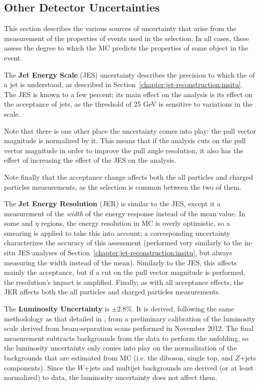 \FloatBarrier

	\subsection{Other Detector Uncertainties}
	\label{chapter:color:uncertainties:other}

	This section describes the various sources of uncertainty that arise from the measurement of the properties of events used in the selection. In all cases, these assess the degree to which the MC predicts the properties of some object in the event.


	The \textbf{Jet Energy Scale} (JES) uncertainty describes the precision to which the \pt of a jet is understood, as described in Section~\ref{chapter:jet-reconstruction:insitu}. The JES is known to a few percent; its main effect on the analysis is its effect on the acceptance of jets, as the \pt threshold of 25 GeV is sensitive to variations in the \pt scale.

	Note that there is one other place the \pt uncertainty comes into play: the pull vector magnitude is normalized by it. This means that if the analysis cuts on the pull vector magnitude in order to improve the pull angle resolution, it also has the effect of increasing the effect of the JES on the analysis.

	Note finally that the acceptance change affects both the all particles and charged particles measurements, as the selection is common between the two of them.

	The \textbf{Jet Energy Resolution} (JER) is similar to the JES, except it a measurement of the \textit{width} of the energy response instead of the mean value. In some \pt and $\eta$ regions, the energy resolution in MC is overly optimistic, so a smearing is applied to take this into account; a corresponding uncertainty characterizes the accuracy of this assessment (performed very similarly to the in-situ JES analyses of Section~\ref{chapter:jet-reconstruction:insitu}, but always measuring the width instead of the mean). Similarly to the JES, this affects mainly the acceptance, but if a cut on the pull vector magnitude is performed, the resolution's impact is amplified. Finally, as with all acceptance effects, the JER affects both the all particles and charged particles measurements.


	The \textbf{Luminosity Uncertainty} is $\pm2.8\%$. It is derived, following the same methodology as that detailed in \cite{ATLASLumi}, from a preliminary calibration of the luminosity scale derived from beam-separation scans performed in November 2012. The final measurement subtracts backgrounds from the data to perform the unfolding, so the luminosity uncertainty only comes into play on the normalization of the backgrounds that are estimated from MC (i.e. the diboson, single top, and $Z$+jets components). Since the $W$+jets and multijet backgrounds are derived (or at least normalized) to data, the luminosity uncertainty does not affect them.

